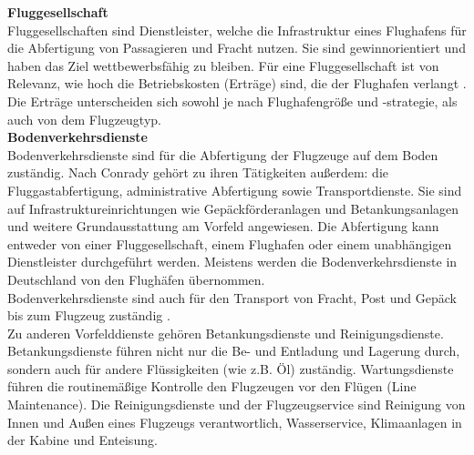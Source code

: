 \textbf{Fluggesellschaft} \\
Fluggesellschaften sind Dienstleister, welche die Infrastruktur eines Flughafens für die Abfertigung von Passagieren und Fracht nutzen. 
Sie sind gewinnorientiert und haben das Ziel wettbewerbsfähig zu bleiben. 
Für eine Fluggesellschaft ist von Relevanz, wie hoch die Betriebskosten (Erträge)
sind, die der Flughafen verlangt \cite{schaar2010analysis}. Die Erträge unterscheiden sich sowohl je nach Flughafengröße und -strategie,
als auch von dem Flugzeugtyp.\\
%
\textbf{Bodenverkehrsdienste} \\ %
Bodenverkehrsdienste sind für die Abfertigung der Flugzeuge auf dem Boden zuständig.
Nach Conrady \cite{conrady2019luftverkehr} gehört zu ihren Tätigkeiten außerdem:  
die Fluggastabfertigung, administrative Abfertigung sowie Transportdienste.
Sie sind auf Infrastruktureinrichtungen wie Gepäckförderanlagen und Betankungsanlagen und weitere Grundausstattung am Vorfeld angewiesen. 
Die Abfertigung kann entweder von einer Fluggesellschaft, einem Flughafen oder einem unabhängigen Dienstleister durchgeführt werden. 
Meistens werden die Bodenverkehrsdienste in Deutschland von den Flughäfen übernommen.\\ %
%
Bodenverkehrsdienste sind auch für den Transport von Fracht, Post und Gepäck bis zum Flugzeug zuständig \cite{mensen2013handbuch}.\\
Zu anderen Vorfelddienste gehören Betankungsdienste und Reinigungsdienste.
Betankungsdienste führen nicht nur die Be- und Entladung und Lagerung durch, sondern auch für andere Flüssigkeiten (wie z.B. Öl) zuständig.
Wartungsdienste führen die routinemäßige Kontrolle den Flugzeugen vor den Flügen (Line Maintenance).
Die Reinigungsdienste und der Flugzeugservice sind Reinigung von Innen und Außen eines Flugzeugs verantwortlich, Wasserservice, 
Klimaanlagen in der Kabine und Enteisung.
%
%

